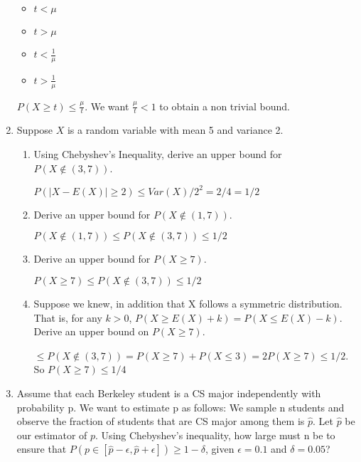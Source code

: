 \documentclass[11pt,preview]{standalone} %
\begin{document}
\begin{enumerate}
\begin{Choices}
\begin{itemize}
	\TrueChoice\item $t < \mu$
	\FalseChoice\item $t > \mu$
	\FalseChoice\item $t < \frac{1}{\mu}$
	\FalseChoice\item $t > \frac{1}{\mu}$

\end{itemize}
\Solution $P(X \geq t ) \leq \frac{\mu}{t}$. We want $\frac{\mu}{t} < 1$ to obtain a non trivial bound. 
\end{Choices}

\item Suppose $X$ is a random variable with mean 5 and variance 2.

\begin{enumerate}
	\item Using Chebyshev's Inequality, derive an upper bound for $P(X \notin (3, 7))$.
	\begin{Freeform}{0.5}
	\Solution $P(|X - E(X)| \geq 2) \leq Var(X) / 2^2 = 2 / 4 = 1/2$

	\end{Freeform}

	\item Derive an upper bound for $P(X \notin (1, 7))$. 
	\begin{Freeform}{0.5}
	$P(X \notin (1, 7)) \leq P(X \notin (3, 7)) \leq 1/2$
	\end{Freeform}

	\item Derive an upper bound for $P(X \geq 7)$.
	\begin{Freeform}{0.5}
	$P(X \geq 7) \leq P(X \notin (3, 7)) \leq 1/2$
	\end{Freeform}


	\item Suppose we knew, in addition that X follows a symmetric distribution. That is, for any $k > 0$, $P(X \geq  E(X) + k) = P(X \leq  E(X) - k)$. Derive an upper bound on $P(X \geq 7)$.

	\begin{Freeform}{0.25}
	$\leq P(X \notin (3, 7)) = P(X \geq 7) + P(X \leq 3) = 2P(X \geq 7) \leq 1/2$. So $P(X \geq 7) \leq 1/4$
	\end{Freeform}



\end{enumerate}
\item Assume that each Berkeley student is a CS major independently with probability p. We want to estimate p as follows: We sample n students and observe the fraction of students that are CS major among them is $\hat{p}$. Let $\hat{p}$ be our estimator of $p$. Using Chebyshev's inequality, how large must n be to ensure that $P(p \in [\hat{p} - \epsilon, \hat{p} + \epsilon]) \geq 1 - \delta$, given $\epsilon = 0.1$ and $\delta = 0.05$? 


\end{enumerate}
\end{document}
